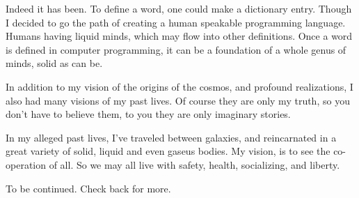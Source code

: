 \documentclass{report}
\begin{document}
Indeed it has been. To define a word, one could make a dictionary entry. Though
I decided to go the path of creating a human speakable programming language.
Humans having liquid minds, which  may flow into other definitions. Once a word
is defined in computer programming, it can be a foundation of a whole genus of
minds, solid as can be.  

In addition to my vision of the origins of the cosmos, and profound
realizations, I also had many visions of my past lives. Of course they are only
my truth, so you don't have to believe them, to you they are only imaginary
stories. 

In my alleged past lives, I've traveled between galaxies, and reincarnated in a
great variety of solid, liquid and even gaseus bodies. My vision, is to see the
co-operation of all. So we may all live with safety, health, socializing, and
liberty. 








To be continued.
Check back for more.
\end{document}
